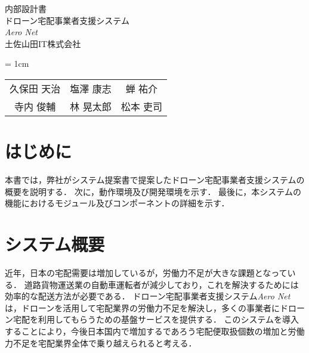 \documentclass[a4paper, titlepage]{jsarticle}
\date{\today}
\newcommand{\system}{\textsl{Aero Net}}
\begin{document}
\begin{titlepage}
  \centering
  \vspace*{150truept}
  {\Large 内部設計書}\\
  \vspace*{50truept}
  {\Huge ドローン宅配事業者支援システム} \\
  \vspace{15truept}
  {\Huge \system} \\
  \vspace{50truept}
  {\LARGE 土佐山田IT株式会社}\\
  \vspace{20truept}
  {\large{\tabcolsep = 1cm
      \begin{tabular}{ccc}
        久保田 天治 & 塩澤 康志 & 蝉 祐介  \\
        寺内 俊輔  & 林 晃太郎 & 松本 吏司
      \end{tabular}
    }}
\end{titlepage}
\newcommand{\fig}[2]{
  \begin{figure}[H]
    \centering
    \texttt{[image: flow/\#1.pdf]}
    \caption{#2}
    \label{fig:#1}
  \end{figure}
  \clearpage
}
\newcommand{\ui}[2]{
  \begin{figure}[H]
    \centering
    \fbox{
      \texttt{[image: ui/\#1]}
      }
    \caption{#2}
    \label{fig:#1}
  \end{figure}
}

\tableofcontents

\clearpage

\section{はじめに}
本書では，弊社がシステム提案書で提案したドローン宅配事業者支援システムの概要を説明する．
次に，動作環境及び開発環境を示す．
最後に，本システムの機能におけるモジュール及びコンポーネントの詳細を示す．

\section{システム概要}
近年，日本の宅配需要は増加しているが，労働力不足が大きな課題となっている．
道路貨物運送業の自動車運転者が減少しており，これを解決するためには効率的な配送方法が必要である．
ドローン宅配事業者支援システム\system は，ドローンを活用して宅配業界の労働力不足を解決し，多くの事業者にドローン宅配を利用してもらうための基盤サービスを提供する．
このシステムを導入することにより，今後日本国内で増加するであろう宅配便取扱個数の増加と労働力不足を宅配業界全体で乗り越えられると考える．
\end{document}
